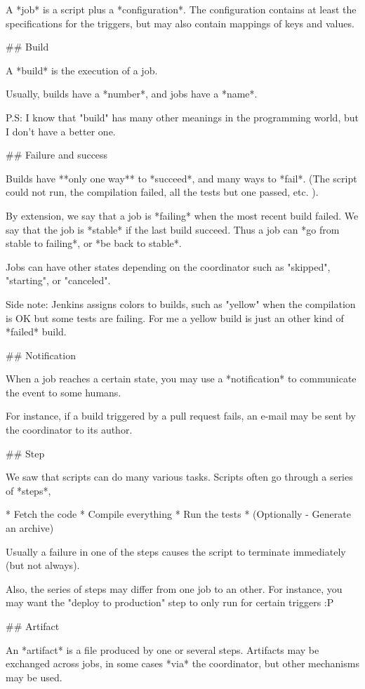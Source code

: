 A *job* is a script plus a *configuration*. The configuration contains
at least the specifications for the triggers, but may also contain
mappings of keys and values.

## Build

A *build* is the execution of a job.

Usually, builds have a *number*, and jobs have a *name*.

P.S: I know that "build" has many other meanings in the programming world, but I don't have a better one.

## Failure and success

Builds have **only one way** to *succeed*, and many ways to *fail*. (The
script could not run, the compilation failed, all the tests but one
passed, etc. ).

By extension, we say that a job is *failing* when the most recent build
failed. We say that the job is *stable* if the last build succeed. Thus
a job can *go from stable to failing*, or *be back to stable*.

Jobs can have other states depending on the coordinator such as
"skipped", "starting", or "canceled".

Side note: Jenkins assigns colors to builds, such as "yellow" when the
compilation is OK but some tests are failing. For me a yellow build is
just an other kind of *failed* build.

## Notification

When a job reaches a certain state, you may use a *notification* to
communicate the event to some humans.

For instance, if a build triggered by a pull request fails, an e-mail
may be sent by the coordinator to its author.


## Step

We saw that scripts can do many various tasks. Scripts often go through
a series of *steps*,

* Fetch the code
* Compile everything
* Run the tests
* (Optionally - Generate an archive)

Usually a failure in one of the steps causes the script to terminate
immediately (but not always).

Also, the series of steps may differ from one job to an other. For
instance, you may want the "deploy to production" step to only run for
certain triggers :P

## Artifact

An *artifact* is a file produced by one or several steps. Artifacts may
be exchanged across jobs, in some cases *via* the coordinator, but other
mechanisms may be used.

